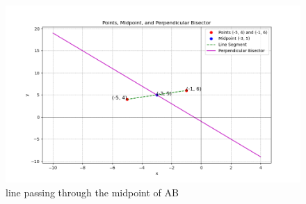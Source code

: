 \documentclass[journal]{IEEEtran}
\begin{document}
\begin{figure}[h!]
   \centering
   \includegraphics[width=0.7\linewidth]{figs/fig1.png}
   \caption{line passing through the midpoint of AB}
\end{figure}
\end{document}
